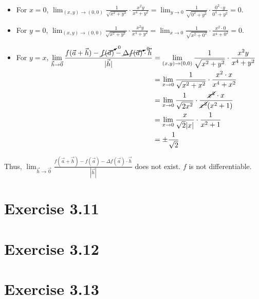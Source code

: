 \documentclass[11pt,fleqn]{book} %
\begin{document}
\begin{itemize}
    \item For $x = 0$, $\lim_{(x,y)\to(0,0)} \frac{1}{\sqrt{x^2+y^2}} \cdot \frac{x^2y}{x^4 + y^2} = \lim_{y\to0} \frac{1}{\sqrt{0^2+y^2}} \cdot \frac{0^2 \cdot y}{0^4 + y^2} = 0$. 
    \item For $y = 0$, $\lim_{(x,y)\to(0,0)} \frac{1}{\sqrt{x^2+y^2}} \cdot \frac{x^2y}{x^4 + y^2} = \lim_{x\to0} \frac{1}{\sqrt{x^2+0^2}} \cdot \frac{x^2 \cdot 0}{x^4 + 0^2} = 0$. 
    \item For $y = x$, $\begin{aligned}[t]
        \lim_{\vec{h}\to\vec{0}} \frac{f(\vec{a} + \vec{h}) - \cancelto{0}{f(\vec{a})} - \cancelto{0}{\Delta f(\vec{a})} \cdot \vec{h}}{| \vec{h} |}
         & = \lim_{(x,y)\to(0,0)} \frac{1}{\sqrt{x^2+y^2}} \cdot \frac{x^2y}{x^4 + y^2}                   \\
         & = \lim_{x\to0} \frac{1}{\sqrt{x^2 + x^2}} \cdot \frac{x^2 \cdot x}{x^4 + x^2}                  \\
         & = \lim_{x\to0} \frac{1}{\sqrt{2x^2}} \cdot \frac{\cancel{x^2} \cdot x}{\cancel{x^2} (x^2 + 1)} \\
         & = \lim_{x\to0} \frac{x}{\sqrt{2}|x|} \cdot \frac{1}{x^2 + 1}                                   \\
         & = \pm \frac{1}{\sqrt{2}}
    \end{aligned}$
\end{itemize}

Thus, $\lim_{\vec{h}\to\vec{0}} \frac{f(\vec{a} + \vec{h}) - f(\vec{a}) - \Delta f(\vec{a}) \cdot \vec{h}}{| \vec{h} |}$ does not exist. $f$ is not differentiable. 

\section*{Exercise 3.11}

\section*{Exercise 3.12}

\section*{Exercise 3.13}

\end{document}
